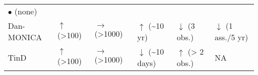 \documentclass[
]{book}
\begin{document}
\begin{longtable}[]{@{}llllll@{}}
\begin{minipage}[t]{0.14\columnwidth}
\(\bullet\) (none)\strut
\end{minipage}\tabularnewline
\begin{minipage}[t]{0.14\columnwidth}\raggedright
Dan-MONICA\strut
\end{minipage} & \begin{minipage}[t]{0.14\columnwidth}\raggedright
\(\uparrow\) (\textgreater100)\strut
\end{minipage} & \begin{minipage}[t]{0.14\columnwidth}\raggedright
\(\rightarrow\) (\textgreater1000)\strut
\end{minipage} & \begin{minipage}[t]{0.14\columnwidth}\raggedright
\(\uparrow\) (\textasciitilde10 yr)\strut
\end{minipage} & \begin{minipage}[t]{0.14\columnwidth}\raggedright
\(\downarrow\) (3 obs.)\strut
\end{minipage} & \begin{minipage}[t]{0.14\columnwidth}\raggedright
\(\downarrow\) (1 ass./5 yr)\strut
\end{minipage}\tabularnewline
\begin{minipage}[t]{0.14\columnwidth}\raggedright
TinD\strut
\end{minipage} & \begin{minipage}[t]{0.14\columnwidth}\raggedright
\(\uparrow\) (\textgreater100)\strut
\end{minipage} & \begin{minipage}[t]{0.14\columnwidth}\raggedright
\(\rightarrow\) (\textgreater1000)\strut
\end{minipage} & \begin{minipage}[t]{0.14\columnwidth}\raggedright
\(\downarrow\) (\textasciitilde10 days)\strut
\end{minipage} & \begin{minipage}[t]{0.14\columnwidth}\raggedright
\(\uparrow\) (\textgreater{} 2 obs.)\strut
\end{minipage} & \begin{minipage}[t]{0.14\columnwidth}\raggedright
NA\strut
\end{minipage}\tabularnewline
\bottomrule
\end{longtable}
\end{document}
